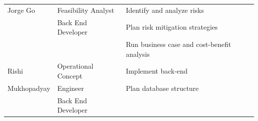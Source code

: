 \begin{table}[h]
\begin{tabularx}{\textwidth}{@{}llX@{}}
Jorge Go                                                    & Feasibility Analyst           & Identify and analyze risks                                   \\
                                                            & Back End Developer            & Plan risk mitigation strategies                              \\
                                                            &                               & Run business case and cost-benefit analysis                  \\
Rishi & Operational Concept & Implement back-end                                           \\
Mukhopadyay                                                        & Engineer           & Plan database structure              \\
& Back End Developer &                       

\\ \bottomrule
\end{tabularx}
\end{table}